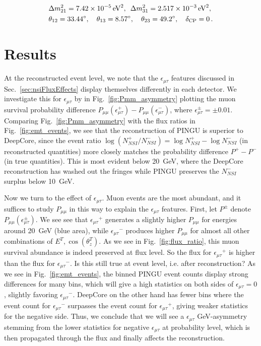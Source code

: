 \documentclass{article}
\newcommand{\ztrue}{\ensuremath{\cos{(\theta_z^{T})}}}
\newcommand{\emt}{\ensuremath{\epsilon_{\mu\tau}}}
\newcommand{\Etrue}{E^{T}}
\newcommand{\dm}{\Delta m^2_{31}}
\begin{document}
\begin{align}\label{eq:PINGUparams}
    &\Delta m^2_{21} =  \SI{7.42e-5}{\electronvolt^2},\hspace{0.5em} \dm =  \SI{2.517e-3}{\electronvolt^2}, \nonumber \\
    &\theta_{12} = \SI{33.44}{\degree},\hspace{1em} \theta_{13} = \SI{8.57}{\degree},\hspace{1em} \theta_{23} = \SI{49.2}{\degree}, \hspace{1em} \delta_\text{CP} = 0\,.
\end{align}

\section{Results}
At the reconstructed event level, we note that the $\emt$ features discussed in Sec.~\ref{sec:nsiFluxEffects} display themselves differently in each detector.
We investigate this for $\emt$ by in Fig.~\ref{fig:Pmm_asymmetry} plotting the muon survival probability difference $P_{\mu\mu}(\epsilon^+_{\mu\tau}) - P_{\mu\mu}(\epsilon^-_{\mu\tau})$, where 
$\epsilon^\pm_{\mu\tau} = \pm 0.01$.
Comparing Fig.~\ref{fig:Pmm_asymmetry} with the flux ratios in Fig.~\ref{fig:emt_events}, we see that the reconstruction of PINGU is
superior to DeepCore, since the event ratio $\log{(N^+_{NSI}/N^-_{NSI})} = \log{N^+_{NSI}} - \log{N^-_{NSI}}$ (in reconstructed quantities) 
more closely matches the probability difference $P^+-P^-$ (in true quantities).
This is most evident below \SI{20}{\GeV}, where the DeepCore reconstruction has washed out the fringes while PINGU preserves the $N^-_{NSI}$ surplus below \SI{10}{\GeV}.

Now we turn to the effect of $\emt$. Muon events are the most abundant, and it suffices to study $P_{\mu\mu}$ in this way to explain the $\emt$ features. 
First, let $P^\pm$ denote $P_{\mu\mu}(\epsilon^\pm_{\mu\tau})$. 
We see see that $\emt^+$ generates a slightly higher $P_{\mu\mu}$ for energies around \SI{20}{\GeV} (blue area),
while $\emt^-$ produces higher $P_{\mu\mu}$ for almost all other combinations of ${\Etrue,\ztrue}$. As we see in Fig.~\ref{fig:flux_ratio}, this muon survival abundance 
is indeed preserved at flux level. So the flux for $\emt^+$ is higher than the flux for $\emt^-$. Is this still true at event level, i.e. after reconstruction? 
As we see in Fig.~\ref{fig:emt_events}, the binned PINGU event counts display strong differences for many bins, which will give a high statistics on both sides of $\emt=0$, slightly favoring $\emt^-$. 
DeepCore on the other hand has fewer bins where the event count for $\emt^-$ surpasses the event count for $\emt^+$, 
giving weaker statistics for the negative side. Thus, we conclude that we will see a $\emt$ \si{GeV}-asymmetry stemming from the lower statistics 
for negative $\emt$ at probability level, which is then propagated through the flux and finally affects the reconstruction. %
\end{document}

